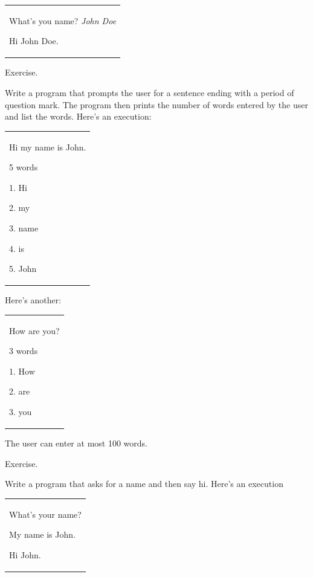 \begin{longtable}[]{@{}
  >{\raggedright\arraybackslash}p{}@{}}
\toprule\noalign{}
 \\
\midrule\noalign{}
\endhead
\bottomrule\noalign{}
\endlastfoot
What's you name? \emph{John Doe}

Hi John Doe. \\
\end{longtable}

Exercise.

Write a program that prompts the user for a sentence ending with a
period of question mark. The program then prints the number of words
entered by the user and list the words. Here's an execution:

\begin{longtable}[]{@{}
  >{\raggedright\arraybackslash}p{}@{}}
\toprule\noalign{}
 \\
\midrule\noalign{}
\endhead
\bottomrule\noalign{}
\endlastfoot
Hi my name is John.

5 words

1. Hi

2. my

3. name

4. is

5. John \\
\end{longtable}

Here's another:

\begin{longtable}[]{@{}
  >{\raggedright\arraybackslash}p{}@{}}
\toprule\noalign{}
 \\
\midrule\noalign{}
\endhead
\bottomrule\noalign{}
\endlastfoot
How are you?

3 words

1. How

2. are

3. you \\
\end{longtable}

The user can enter at most 100 words.

Exercise.

Write a program that asks for a name and then say hi. Here's an
execution

\begin{longtable}[]{@{}
  >{\raggedright\arraybackslash}p{}@{}}
\toprule\noalign{}
 \\
\midrule\noalign{}
\endhead
\bottomrule\noalign{}
\endlastfoot
What's your name?

My name is John.

Hi John. \\
\end{longtable}


